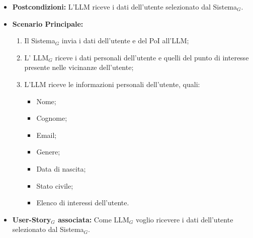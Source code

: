 \documentclass[10pt]{article}
\begin{document}
\begin{justify}
\begin{itemize}
\begin{itemize}
        \end{itemize}
      \item \textbf{Postcondizioni:} L'LLM riceve i dati dell'utente selezionato dal Sistema$_G$.
    \item \textbf{Scenario Principale:} 
        \begin{enumerate}
          \item Il Sistema$_G$ invia i dati dell'utente e del PoI all'LLM;
        \item L' LLM$_G$ riceve i dati personali dell'utente e quelli del punto di interesse presente nelle vicinanze dell'utente;
          \item L'LLM riceve le informazioni personali dell'utente, quali:
          \begin{itemize}
          \item Nome;
          \item Cognome;
          \item Email;
          \item Genere;
          \item Data di nascita;
          \item Stato civile;
          \item Elenco di interessi dell'utente.
          \end{itemize}
        \end{enumerate}
      \item \textbf{User-Story$_G$ associata:} Come LLM$_G$ voglio ricevere i dati dell'utente selezionato dal Sistema$_G$.
\end{itemize}

\end{justify}
\end{document}
